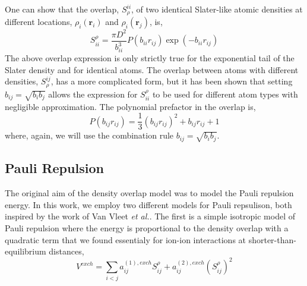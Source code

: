 \documentclass[journal=jacsat,manuscript=article]{achemso}
\begin{document}
One can show that the overlap, $S^{ii}_\rho$, of two identical Slater-like atomic densities
at different locations, $\rho_i(\mathbf{r}_i)$ and $\rho_i(\mathbf{r}_j)$, is,
\begin{equation}
  S_{ii}^\rho=\frac{\pi D^2}{b_{ii}^3}P(b_{ii}r_{ij})\exp(-b_{ii}r_{ij})
\end{equation}
The above overlap expression is only strictly true for the exponential tail
of the Slater density and for identical atoms. The overlap between atoms
with different densities, $S^{ij}_\rho$, has a more complicated form, but
it has been shown that setting $b_{ij}=\sqrt{b_ib_j}$ allows the expression
for $S_{ii}^\rho$ to be used for different atom types with negligible
approximation\cite{van2016beyond}. The polynomial prefactor in the overlap is,
\begin{equation}
  P(b_{ij}r_{ij})=\frac13(b_{ij}r_{ij})^2 + b_{ij}r_{ij}+1
\end{equation}
where, again, we will use the combination rule $b_{ij}=\sqrt{b_ib_j}$.

\subsection*{Pauli Repulsion}
The original aim of the density overlap model was to model the
Pauli repulsion energy.\cite{wallqvist1989new,wheatley1990overlap,gordon1996approximate}
In this work, we employ two different models for Pauli repsulison,
both inspired by the work of Van Vleet \textit{et al.}\cite{van2016beyond,van2018new}.
The first is a simple isotropic model of Pauli repulsion where the energy is proportional
to the density overlap with a quadratic term that we found essentialy for ion-ion interactions
at shorter-than-equilibrium distances,
\begin{equation}
  V^{exch} = \sum_{i<j}a_{ij}^{(1),exch}S_{ij}^\rho+a_{ij}^{(2),exch}(S_{ij}^\rho)^2
  \label{eq:exch_iso}
\end{equation}
\end{document}
